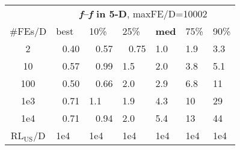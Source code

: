 \begin{tabular}{c|llllll}
 & \multicolumn{6}{|c}{\textbf{\textit{f}\raisebox{-0.35ex}{1}--\textit{f}\raisebox{-0.35ex}{24} in 5-D}, maxFE/D=10002}\\
\#FEs/D & best & 10\% & 25\% & \textbf{med} & 75\% & 90\%\\
2 & ~\,0.40 & ~\,0.57 & ~\,0.75 & \hspace*{1ex}1.0 & \hspace*{1ex}1.9 & \hspace*{1ex}3.3\\
10 & ~\,0.57 & ~\,0.99 & \hspace*{1ex}1.5 & \hspace*{1ex}2.0 & \hspace*{1ex}3.8 & \hspace*{1ex}5.1\\
100 & ~\,0.50 & ~\,0.66 & \hspace*{1ex}2.0 & \hspace*{1ex}2.9 & \hspace*{1ex}6.8 & 11\\
1e3 & ~\,0.71 & \hspace*{1ex}1.1 & \hspace*{1ex}1.9 & \hspace*{1ex}4.3 & 10 & 29\\
1e4 & ~\,0.71 & ~\,0.94 & \hspace*{1ex}2.0 & \hspace*{1ex}5.4 & 13 & 44\\
$\text{RL}_{\text{US}}$/D & 1e4 & 1e4 & 1e4 & 1e4 & 1e4 & 1e4
\end{tabular}
